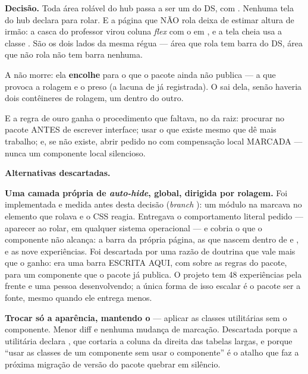 \textbf{Decisão.} Toda área rolável do hub passa a ser um  do DS,
com . Nenhuma tela do hub declara  para rolar. E a
página que NÃO rola deixa de estimar altura de irmão: a casca do professor virou
coluna \emph{flex} com o  em , e a tela cheia usa a classe
. São os dois lados da mesma régua --- área que rola tem barra
do DS, área que não rola não tem barra nenhuma.

A  não morre: ela \textbf{encolhe} para o que o pacote ainda não
publica --- a  que provoca a rolagem e o  preso (a
lacuna de  já registrada). O  sai dela, senão
haveria dois contêineres de rolagem, um dentro do outro.

E a regra de ouro ganha o procedimento que faltava, no  da raiz:
procurar no pacote ANTES de escrever interface; usar o que existe mesmo que dê
mais trabalho; e, se não existe, abrir pedido no  com
compensação local MARCADA --- nunca um componente local silencioso.

\textbf{Alternativas descartadas.}

\textbf{Uma camada própria de \emph{auto-hide}, global, dirigida por rolagem.}
Foi implementada e medida antes desta decisão (\emph{branch}
): um módulo na  marcava
 no elemento que rolava e o CSS reagia. Entregava o
comportamento literal pedido --- aparecer ao rolar, em qualquer sistema
operacional --- e cobria o que o componente não alcança: a barra da própria
página, as que nascem dentro de  e , e as nove
experiências. Foi descartada por uma razão de doutrina que vale mais que o
ganho: era uma barra ESCRITA AQUI, com  sobre as regras do
pacote, para um componente que o pacote já publica. O projeto tem 48
experiências pela frente e uma pessoa desenvolvendo; a única forma de isso
escalar é o pacote ser a fonte, mesmo quando ele entrega menos.

\textbf{Trocar só a aparência, mantendo o } --- aplicar as classes
utilitárias  sem o componente. Menor diff e nenhuma
mudança de marcação. Descartada porque a utilitária declara
, que cortaria a coluna da direita das tabelas largas, e
porque \enquote{usar as classes de um componente sem usar o componente} é o
atalho que faz a próxima migração de versão do pacote quebrar em silêncio.

